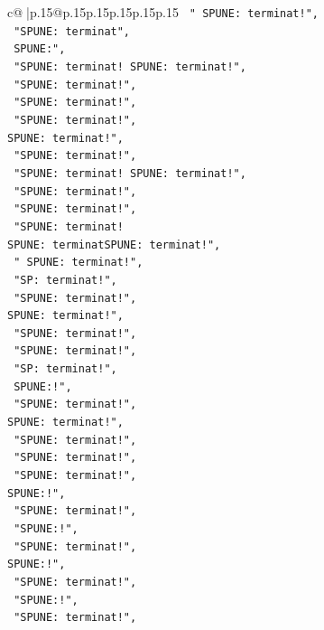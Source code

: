 \documentclass{article}
\begin{document}
{\begin{supertabular}{c@{$\;$}|p{.15\linewidth}@{}p{.15\linewidth}p{.15\linewidth}p{.15\linewidth}p{.15\linewidth}p{.15\linewidth}}
{{{\texttt{    " SPUNE: terminat!",} \\
\texttt{    "SPUNE: terminat",} \\
\texttt{    SPUNE:",} \\
\texttt{    "SPUNE: terminat! SPUNE: terminat!",} \\
\texttt{    "SPUNE: terminat!",} \\
\texttt{    "SPUNE: terminat!",} \\
\texttt{    "SPUNE: terminat!",} \\
\texttt{SPUNE: terminat!",} \\
\texttt{    "SPUNE: terminat!",} \\
\texttt{    "SPUNE: terminat! SPUNE: terminat!",} \\
\texttt{    "SPUNE: terminat!",} \\
\texttt{    "SPUNE: terminat!",} \\
\texttt{    "SPUNE: terminat! } \\
\texttt{SPUNE: terminatSPUNE: terminat!",} \\
\texttt{    " SPUNE: terminat!",} \\
\texttt{    "SP: terminat!",} \\
\texttt{    "SPUNE: terminat!",} \\
\texttt{SPUNE: terminat!",} \\
\texttt{    "SPUNE: terminat!",} \\
\texttt{    "SPUNE: terminat!",} \\
\texttt{    "SP: terminat!",} \\
\texttt{    SPUNE:!",} \\
\texttt{    "SPUNE: terminat!",} \\
\texttt{SPUNE: terminat!",} \\
\texttt{    "SPUNE: terminat!",} \\
\texttt{    "SPUNE: terminat!",} \\
\texttt{    "SPUNE: terminat!",} \\
\texttt{SPUNE:!",} \\
\texttt{    "SPUNE: terminat!",} \\
\texttt{    "SPUNE:!",} \\
\texttt{    "SPUNE: terminat!",} \\
\texttt{SPUNE:!",} \\
\texttt{    "SPUNE: terminat!",} \\
\texttt{    "SPUNE:!",} \\
\texttt{    "SPUNE: terminat!",} \\
}}}
\end{supertabular}}
\end{document}

